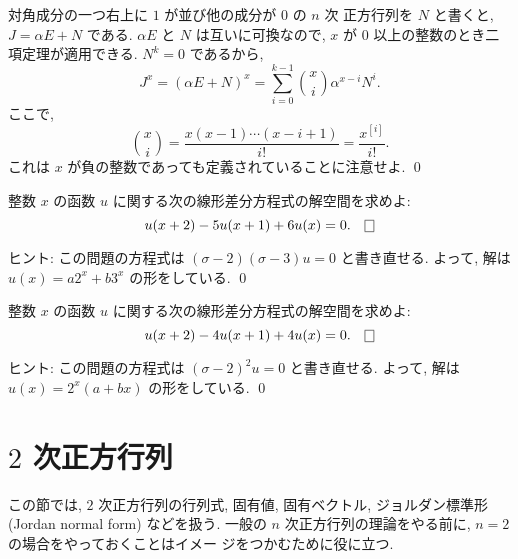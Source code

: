 \documentclass[12pt,twoside]{jarticle}
\begin{document}
対角成分の一つ右上に $1$ が並び他の成分が $0$ の $n$ 次
正方行列を $N$ と書くと, $J = \alpha E + N$ である. 
$\alpha E$ と $N$ は互いに可換なので, 
$x$ が $0$ 以上の整数のとき二項定理が適用できる. $N^k=0$ であるから,
\begin{equation*}
  J^x 
  = (\alpha E + N)^x 
  = \sum_{i=0}^{k-1} \binom{x}{i} \alpha^{x-i}N^i.
\end{equation*}
ここで,
\begin{equation*}
  \binom{x}{i} = \frac{x(x-1)\cdots(x-i+1)}{i!} = \frac{x^{[i]}}{i!}.
\end{equation*}
これは $x$ が負の整数であっても定義されていることに注意せよ.
\qed


\begin{question}
  整数 $x$ の函数 $u$ に関する次の線形差分方程式の解空間を求めよ:
  \begin{equation*}
    u(x+2) - 5 u(x+1) + 6 u(x) = 0.
  \qed
  \end{equation*}
\end{question}

\noindent
ヒント: この問題の方程式は $(\sigma-2)(\sigma-3)u = 0$ と書き直せる. 
よって, 解は $u(x) =  a 2^x + b 3^x$ の形をしている.
\qed


\begin{question}
  整数 $x$ の函数 $u$ に関する次の線形差分方程式の解空間を求めよ:
  \begin{equation*}
    u(x+2) - 4 u(x+1) + 4 u(x) = 0.
  \qed
  \end{equation*}
\end{question}

\noindent
ヒント: この問題の方程式は $(\sigma-2)^2 u = 0$ と書き直せる. よって,
解は $u(x) =  2^x(a + bx)$ の形をしている.
\qed


\section{$2$ 次正方行列}
\label{sec:2x2}

この節では, $2$ 次正方行列の行列式, 固有値, 固有ベクトル, ジョルダン標準形
(Jordan normal form) などを扱う. 
一般の $n$ 次正方行列の理論をやる前に, $n=2$ の場合をやっておくことはイメー
ジをつかむために役に立つ.
\end{document}
